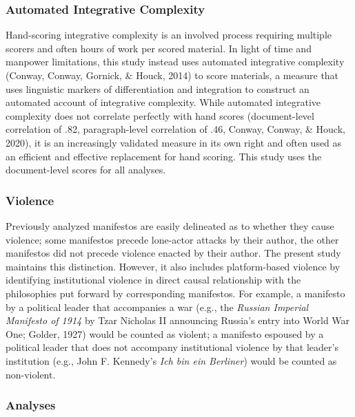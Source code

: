 \documentclass[
  english,
  man,floatsintext]{apa6}
\begin{document}
\subsubsection{Automated Integrative Complexity}\label{automated-integrative-complexity}

Hand-scoring integrative complexity is an involved
process requiring multiple scorers and often hours of work per scored material. In light of
time and manpower limitations, this study instead uses automated integrative complexity
(Conway, Conway, Gornick, \& Houck, 2014) to score materials, a measure that uses linguistic markers of
differentiation and integration to construct an automated account of integrative complexity.
While automated integrative complexity does not correlate perfectly with hand scores
(document-level correlation of .82, paragraph-level correlation of .46, Conway, Conway, \& Houck, 2020), it is an increasingly validated measure in its own right and often used as an
efficient and effective replacement for hand scoring. This study uses the document-level
scores for all analyses.

\subsubsection{Violence}\label{violence}

Previously analyzed manifestos are easily delineated as to whether they cause
violence; some manifestos precede lone-actor attacks by their author, the other manifestos
did not precede violence enacted by their author. The present study maintains this
distinction. However, it also includes platform-based violence by identifying institutional
violence in direct causal relationship with the philosophies put forward by corresponding
manifestos. For example, a manifesto by a political leader that accompanies a war (e.g., the
\emph{Russian Imperial Manifesto of 1914} by Tzar Nicholas II announcing Russia's entry into World
War One; Golder, 1927) would be counted as violent; a manifesto espoused by a political
leader that does not accompany institutional violence by that leader's institution (e.g.,
John F. Kennedy's \emph{Ich bin ein Berliner}) would be counted as non-violent.

\subsubsection{Analyses}\label{analyses}
\end{document}

